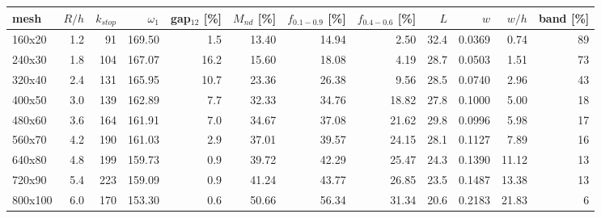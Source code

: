 \setlength{\tabcolsep}{3.5pt}
\begin{tabular}{lrrrrrrrrrrr}
\toprule
mesh & $R/h$ & $k_{stop}$ & $\omega_1$ & gap$_{12}$ [\%] & $M_{nd}$ [\%] & $f_{0.1-0.9}$ [\%] & $f_{0.4-0.6}$ [\%] & $L$ & $w$ & $w/h$ & band [\%] \\
\midrule
160x20 & 1.2 & 91 & 169.50 & 1.5 & 13.40 & 14.94 & 2.50 & 32.4 & 0.0369 & 0.74 & 89 \\
240x30 & 1.8 & 104 & 167.07 & 16.2 & 15.60 & 18.08 & 4.19 & 28.7 & 0.0503 & 1.51 & 73 \\
320x40 & 2.4 & 131 & 165.95 & 10.7 & 23.36 & 26.38 & 9.56 & 28.5 & 0.0740 & 2.96 & 43 \\
400x50 & 3.0 & 139 & 162.89 & 7.7 & 32.33 & 34.76 & 18.82 & 27.8 & 0.1000 & 5.00 & 18 \\
480x60 & 3.6 & 164 & 161.91 & 7.0 & 34.67 & 37.08 & 21.62 & 29.8 & 0.0996 & 5.98 & 17 \\
560x70 & 4.2 & 190 & 161.03 & 2.9 & 37.01 & 39.57 & 24.15 & 28.1 & 0.1127 & 7.89 & 16 \\
640x80 & 4.8 & 199 & 159.73 & 0.9 & 39.72 & 42.29 & 25.47 & 24.3 & 0.1390 & 11.12 & 13 \\
720x90 & 5.4 & 223 & 159.09 & 0.9 & 41.24 & 43.77 & 26.85 & 23.5 & 0.1487 & 13.38 & 13 \\
800x100 & 6.0 & 170 & 153.30 & 0.6 & 50.66 & 56.34 & 31.34 & 20.6 & 0.2183 & 21.83 & 6 \\
\bottomrule
\end{tabular}
